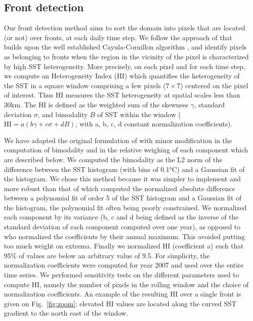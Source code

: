 \subsection{Front detection}

Our front detection method aims to sort the domain into pixels that are located (or not) over fronts, at each daily time step.
We follow the approach of \citet{liu_2016} that builds upon the well established Cayula-Cornillon algorithm \citep{cayula_1992, belkin_2009}, and identify pixels as belonging to fronts when the region in the vicinity of the pixel is characterized by high SST heterogeneity.
More precisely, on each pixel and for each time step, we compute an Heterogeneity Index (HI) which quantifies the heterogeneity of the SST in a square window comprising a few pixels (\(7 \times 7\)) centered on the pixel of interest.
Thus HI measures the SST heterogeneity at spatial scales less than 30km.
The HI is defined as the weighted sum of the skewness \(\gamma\), standard deviation \(\sigma\), and bimodality \(B\) of SST within the window (\(\mathrm{HI} = a \left( b \gamma + c \sigma + d B \right)\), with a, b, c, d constant normalization coefficients).

We have adapted the original formulation of \citet{liu_2016} with minor modification in the computation of bimodality and in the relative weighing of each component which are described below.
We computed the bimodality as the L2 norm of the difference between the SST histogram (with bins of 0.1°C) and a Gaussian fit of the histogram.
We chose this method because it was simpler to implement and more robust than that of \citet{liu_2016} which computed the normalized absolute difference between a polynomial fit of order 5 of the SST histogram and a Gaussian fit of the histogram, the polynomial fit often being poorly constrained.
We normalized each component by its variance (b, c and d being defined as the inverse of the standard deviation of each component computed over one year), as opposed to \citet{liu_2016} who normalized the coefficients by their annual maximum.
This avoided putting too much weight on extrema.
Finally we normalized HI (coefficient a) such that 95\% of values are below an arbitrary value of 9.5.
For simplicity, the normalization coefficients were computed for year 2007 and used over the entire time series.
We performed sensitivity tests on the different parameters used to compute HI, namely the number of pixels in the rolling window and the choice of normalization coefficients.
An example of the resulting HI over a single front is given on Fig.~\ref{fig:zoom}; elevated HI values are located along the curved SST gradient to the north east of the window.

